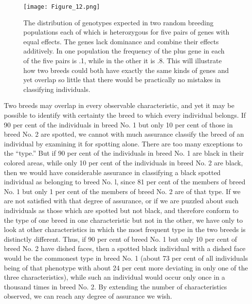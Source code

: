 \begin{figure}
	\centering
    \texttt{[image: Figure\_12.png]}
    \caption{The distribution of genotypes expected in two random breeding populations
			 each of which is heterozygous for five pairs of genes with equal effects. The
			 genes lack dominance and combine their effects additively. In one population the
			 frequency of the plus gene in each of the five pairs is .1, while in the other it is .8.
			 This will illustrate how two breeds could both have exactly the same kinds of genes
			 and yet overlap so little that there would be practically no mistakes in classifying
			 individuals.}
    \label{fig:Lush_Figure_12}
\end{figure}

Two breeds may overlap in every observable characteristic, and yet
it may be possible to identify with certainty the breed to which every
individual belongs. If 90 per cent of the individuals in breed No. 1 but
only 10 per cent of those in breed No. 2 are spotted, we cannot with
much assurance classify the breed of an individual by examining it for
spotting alone. There are too many exceptions to the ``type.'' But if 90
per cent of the individuals in breed No. 1 are black in their colored
areas, while only 10 per cent of the individuals in breed No. 2 are
black, then we would have considerable assurance in classifying a black
spotted individual as belonging to breed No. l, since 81 per cent of the
members of breed No. 1 but only 1 per cent of the members of breed
No. 2 are of that type. If we are not satisfied with that degree of assurance,
or if we are puzzled about such individuals as those which are
spotted but not black, and therefore conform to the type of one breed
in one characteristic but not in the other, we have only to look at other
characteristics in which the most frequent type in the two breeds is distinctly
different. Thus, if 90 per cent of breed No. 1 but only 10 per cent
of breed No. 2 have dished faces, then a spotted black individual with a
dished face would be the commonest type in breed No. 1 (about 73 per
cent of all individuals being of that phenotype with about 24 per cent
more deviating in only one of the three characteristics), while such an
individual would occur only once in a thousand times in breed No. 2.
By extending the number of characteristics observed, we can reach any
degree of assurance we wish.


